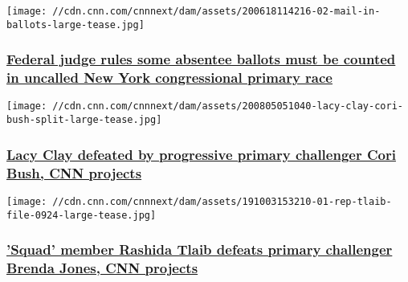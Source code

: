 \href{/2020/08/04/politics/federal-judge-absentee-ballots-new-york/index.html}{}

\texttt{[image: //cdn.cnn.com/cnnnext/dam/assets/200618114216-02-mail-in-ballots-large-tease.jpg]}

\hypertarget{federal-judge-rules-some-absentee-ballots-must-be-counted-in-uncalled-new-york-congressional-primary-race}{%
\subsubsection{\texorpdfstring{\href{/2020/08/04/politics/federal-judge-absentee-ballots-new-york/index.html}{Federal
judge rules some absentee ballots must be counted in uncalled New York
congressional primary
race}}{Federal judge rules some absentee ballots must be counted in uncalled New York congressional primary race}}\label{federal-judge-rules-some-absentee-ballots-must-be-counted-in-uncalled-new-york-congressional-primary-race}}

\href{/2020/08/05/politics/cori-bush-defeats-lacy-clay-missouri-result/index.html}{}

\texttt{[image: //cdn.cnn.com/cnnnext/dam/assets/200805051040-lacy-clay-cori-bush-split-large-tease.jpg]}

\hypertarget{lacy-clay-defeated-by-progressive-primary-challenger-cori-bush-cnn-projects}{%
\subsubsection{\texorpdfstring{\href{/2020/08/05/politics/cori-bush-defeats-lacy-clay-missouri-result/index.html}{Lacy
Clay defeated by progressive primary challenger Cori Bush, CNN
projects}}{Lacy Clay defeated by progressive primary challenger Cori Bush, CNN projects}}\label{lacy-clay-defeated-by-progressive-primary-challenger-cori-bush-cnn-projects}}

\href{/2020/08/05/politics/rashida-tlaib-wins-primary-brenda-jones-michigan-results/index.html}{}

\texttt{[image: //cdn.cnn.com/cnnnext/dam/assets/191003153210-01-rep-tlaib-file-0924-large-tease.jpg]}

\hypertarget{squad-member-rashida-tlaib-defeats-primary-challenger-brenda-jones-cnn-projects}{%
\subsubsection{\texorpdfstring{\href{/2020/08/05/politics/rashida-tlaib-wins-primary-brenda-jones-michigan-results/index.html}{'Squad'
member Rashida Tlaib defeats primary challenger Brenda Jones, CNN
projects}}{'Squad' member Rashida Tlaib defeats primary challenger Brenda Jones, CNN projects}}\label{squad-member-rashida-tlaib-defeats-primary-challenger-brenda-jones-cnn-projects}}

